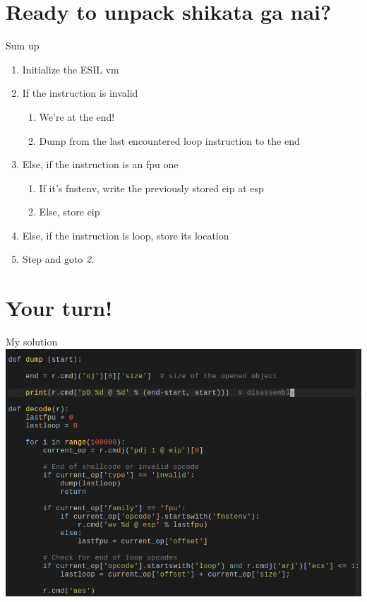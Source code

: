 \documentclass{beamer}
\begin{document}
\section{Ready to unpack shikata ga nai?}

\begin{frame}{Sum up}
	\begin{enumerate}
		\item Initialize the ESIL vm
		\item If the instruction is \alert{invalid}
			\begin{enumerate}
				\item We're at the end!
				\item Dump from the last encountered \alert{loop} instruction to the end
			\end{enumerate}
		\item Else, if the instruction is an fpu one
			\begin{enumerate}
				\item If it's \alert{fnstenv}, write the previously stored \alert{eip} at \alert{esp}
				\item Else, store \alert{eip}
			\end{enumerate}
		\item Else, if the instruction is \alert{loop}, store its location
		\item Step and goto \emph{2}.
	\end{enumerate}
\end{frame}

\section{Your turn!}

\begin{frame}{My solution}
	\includegraphics[width=\textwidth]{solution.png}
\end{frame}
\end{document}
